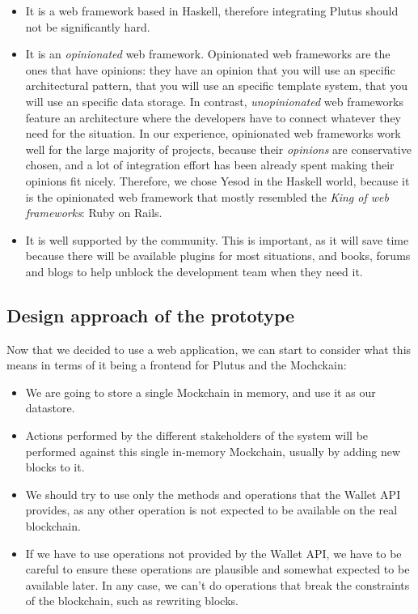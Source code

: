 \documentclass{article}
\begin{document}
\begin{itemize}
  \item It is a web framework based in Haskell, therefore integrating Plutus should not be significantly hard.
  \item It is an \emph{opinionated} web framework. Opinionated web frameworks are the ones that have opinions: they have an opinion that you will use an specific architectural pattern, that you will use an specific template system, that you will use an specific data storage. In contrast, \emph{unopinionated} web frameworks feature an architecture where the developers have to connect whatever they need for the situation. In our experience, opinionated web frameworks work well for the large majority of projects, because their \emph{opinions} are conservative chosen, and a lot of integration effort has been already spent making their opinions fit nicely. Therefore, we chose Yesod in the Haskell world, because it is the opinionated web framework that mostly resembled the \emph{King of web frameworks}: Ruby on Rails.
  \item It is well supported by the community. This is important, as it will save time because there will be available plugins for most situations, and books, forums and blogs to help unblock the development team when they need it.
\end{itemize}

\subsection{Design approach of the prototype}
Now that we decided to use a web application, we can start to consider what this means in terms of it being a frontend for Plutus and the Mochckain:

\begin{itemize}
  \item We are going to store a single Mockchain in memory, and use it as our datastore.
  \item Actions performed by the different stakeholders of the system will be performed against this single in-memory Mockchain, usually by adding new blocks to it.
  \item We should try to use only the methods and operations that the Wallet API provides, as any other operation is not expected to be available on the real blockchain.
  \item If we have to use operations not provided by the Wallet API, we have to be careful to ensure these operations are plausible and somewhat expected to be available later. In any case, we can't do operations that break the constraints of the blockchain, such as rewriting blocks.
\end{itemize}
\end{document}

